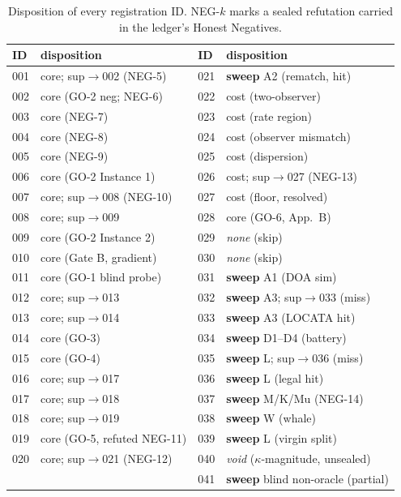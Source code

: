 \documentclass[11pt]{article}
\theoremstyle{remark}
\newcommand{\kalign}{\kappa}
\begin{document}
\begin{table}[h]\footnotesize\centering
\caption{Disposition of every registration ID. NEG-$k$ marks a sealed refutation carried in
the ledger's Honest Negatives.}
\label{tab:registry}
\begin{tabular}{@{}llll@{}}
\toprule
ID & disposition & ID & disposition \\
\midrule
001 & core; sup$\to$002 (NEG-5) & 021 & \textbf{sweep} A2 (rematch, hit) \\
002 & core (GO-2 neg; NEG-6)     & 022 & cost (two-observer) \\
003 & core (NEG-7)               & 023 & cost (rate region) \\
004 & core (NEG-8)               & 024 & cost (observer mismatch) \\
005 & core (NEG-9)               & 025 & cost (dispersion) \\
006 & core (GO-2 Instance 1)     & 026 & cost; sup$\to$027 (NEG-13) \\
007 & core; sup$\to$008 (NEG-10) & 027 & cost (floor, resolved) \\
008 & core; sup$\to$009          & 028 & core (GO-6, App.\ B) \\
009 & core (GO-2 Instance 2)     & 029 & \emph{none} (skip) \\
010 & core (Gate B, gradient)    & 030 & \emph{none} (skip) \\
011 & core (GO-1 blind probe)    & 031 & \textbf{sweep} A1 (DOA sim) \\
012 & core; sup$\to$013          & 032 & \textbf{sweep} A3; sup$\to$033 (miss) \\
013 & core; sup$\to$014          & 033 & \textbf{sweep} A3 (LOCATA hit) \\
014 & core (GO-3)                & 034 & \textbf{sweep} D1--D4 (battery) \\
015 & core (GO-4)               & 035 & \textbf{sweep} L; sup$\to$036 (miss) \\
016 & core; sup$\to$017          & 036 & \textbf{sweep} L (legal hit) \\
017 & core; sup$\to$018          & 037 & \textbf{sweep} M/K/Mu (NEG-14) \\
018 & core; sup$\to$019          & 038 & \textbf{sweep} W (whale) \\
019 & core (GO-5, refuted NEG-11)& 039 & \textbf{sweep} L (virgin split) \\
020 & core; sup$\to$021 (NEG-12) & 040 & \emph{void} ($\kalign$-magnitude, unsealed) \\
    &                            & 041 & \textbf{sweep} blind non-oracle (partial) \\
\bottomrule
\end{tabular}
\end{table}
\end{document}
